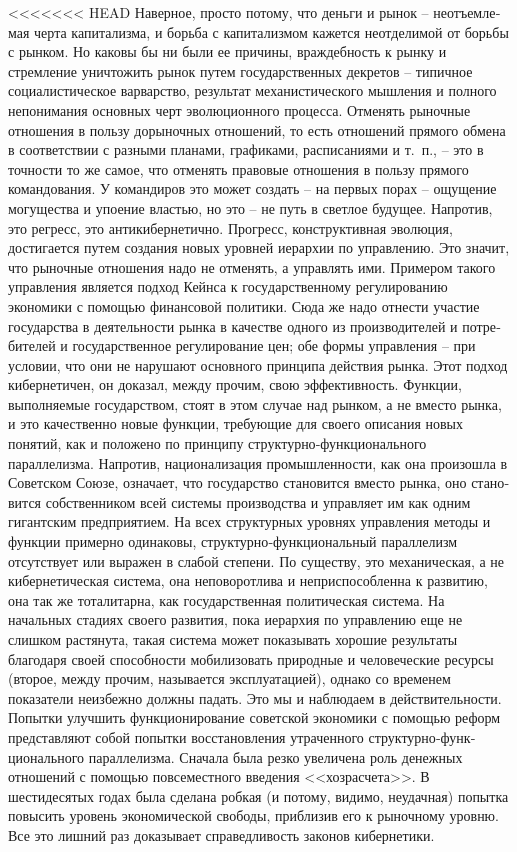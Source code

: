\documentclass{book}
\begin{document}
<<<<<<< HEAD
Наверное, просто потому, что деньги и рынок -- неотъемле­мая черта капитализма, и борьба с капитализмом кажется неот­делимой от борьбы с рынком. Но каковы бы ни были ее причи­ны, враждебность к рынку и стремление уничтожить рынок путем государственных декретов -- типичное социалистическое варварство, результат механистического мышления и полного непонимания основных черт эволюционного процесса. Отменять рыночные отношения в пользу дорыночных отношений, то есть отношений прямого обмена в соответствии с разными планами, графиками, расписаниями и т.~п., -- это в точности то же самое, что отменять правовые отношения в пользу прямого командо­вания. У командиров это может создать -- на первых порах -- ощущение могущества и упоение властью, но это -- не путь в светлое будущее. Напротив, это регресс, это антикибернетично. Прогресс, конструктивная эволюция, достигается путем со­здания новых уровней иерархии по управлению. Это значит, что рыночные отношения надо не отменять, а управлять ими. Примером такого управления является подход Кейнса к госу­дарственному регулированию экономики с помощью финансо­вой политики. Сюда же надо отнести участие государства в дея­тельности рынка в качестве одного из производителей и потре­бителей и государственное регулирование цен; обе формы уп­равления -- при условии, что они не нарушают основного прин­ципа действия рынка. Этот подход кибернетичен,  он доказал, между прочим, свою эффективность. Функции, выполняемые государством, стоят в этом случае над  рынком, а не вместо рынка, и это качественно новые функции, требующие для своего описания новых понятий, как и положено по принципу струк­турно‑функционального параллелизма. Напротив, национализа­ция промышленности, как она произошла в Советском Союзе, означает, что государство становится вместо  рынка, оно стано­вится собственником всей системы производства и управляет им как одним гигантским предприятием. На всех структурных уровнях управления методы и функции примерно одинаковы, структурно‑функциональный параллелизм отсутствует или выра­жен в слабой степени. По существу, это механическая, а не ки­бернетическая система, она неповоротлива и неприспособленна к развитию, она так же тоталитарна, как государственная поли­тическая система. На начальных стадиях своего развития, пока иерархия по управлению еще не слишком растянута, такая си­стема может показывать хорошие результаты благодаря своей способности мобилизовать природные и человеческие ресурсы (второе, между прочим, называется эксплуатацией),  однако со временем показатели неизбежно должны падать. Это мы и на­блюдаем в действительности. Попытки улучшить функциони­рование советской экономики с помощью реформ представляют собой попытки восстановления утраченного структурно‑функ­ционального параллелизма. Сначала была резко увеличена роль денежных отношений с помощью повсеместного введения <<хозрасчета>>. В шестидесятых годах была сделана робкая (и потому, видимо, неудачная) попытка повысить уровень экономической свободы, приблизив его к рыночному уровню. Все это лишний раз доказывает справедливость законов кибернетики.
\end{document}
